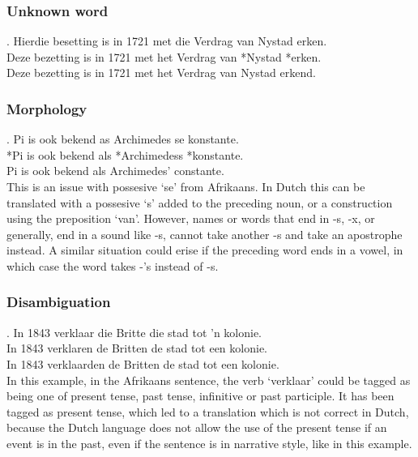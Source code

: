 \documentclass[11pt]{article}
\begin{document}
\subsubsection{Unknown word}

\ex. \label{ex:exist} 
    Hierdie besetting is in 1721 met die Verdrag van Nystad erken. \\
    Deze bezetting is in 1721 met het Verdrag van *Nystad *erken. \\
    Deze bezetting is in 1721 met het Verdrag van Nystad erkend. \\

\subsubsection{Morphology}

\ex. \label{ex:exposs} 
    Pi is ook bekend as Archimedes se konstante. \\
   *Pi is ook bekend als *Archimedess *konstante. \\
    Pi is ook bekend als Archimedes' constante.\\

This is an issue with possesive `se' from Afrikaans. In Dutch this can be translated with a possesive `s' added to the preceding noun,
 or a construction using the preposition `van'. However, names or words that end in -s, -x, or generally, end in a sound like -s,
 cannot take another -s and take an apostrophe instead. A similar situation could erise if the preceding word ends in a vowel,
 in which case the word takes -'s instead of -s.

\subsubsection{Disambiguation}

\ex. \label{ex:exdisam} 
    In 1843 verklaar die Britte die stad tot 'n kolonie. \\
    In 1843 verklaren de Britten de stad tot een kolonie. \\
    In 1843 verklaarden de Britten de stad tot een kolonie.\\

In this example, in the Afrikaans sentence, the verb `verklaar' could be tagged as being one of present tense, past tense,
 infinitive or past participle. It has been tagged as present tense, which led to a translation which is not correct in Dutch, 
because the Dutch language does not allow the use of the present tense if an event is in the past,
 even if the sentence is in narrative style, like in this example.
\end{document}
